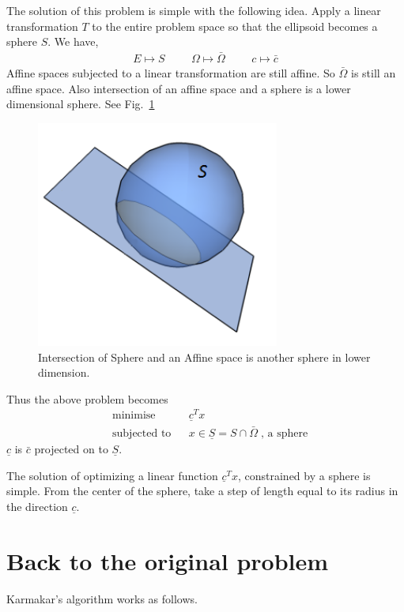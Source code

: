 \documentclass[10pt]{article}
\begin{document}
The solution of this problem is simple with the following idea. Apply a linear transformation $T$ to the entire problem space so that the ellipsoid becomes a sphere $S$. We have,
\begin{align*}
	E\mapsto S\hspace{1cm}
	\Omega \mapsto \bar{\Omega}\hspace{1cm}
	c \mapsto \bar{c}
\end{align*}
Affine spaces subjected to a linear transformation are still affine. So $\bar{\Omega}$ is still an affine space. Also intersection of an affine space and a sphere is a lower dimensional sphere. See Fig.~\ref{fig:sphereintersectionaffine}
\begin{figure}[htbp]
	\begin{center}
	\vspace{1cm}
	\includegraphics[width=8cm]{sphereintersectionaffine.png}
	\end{center}
	\caption{Intersection of Sphere and an Affine space is another sphere in lower dimension.}
	\label{fig:sphereintersectionaffine}
\end{figure}

Thus the above problem becomes 
\begin{align*}
&\text{minimise} &&\underline{c}^Tx\\
&\text{subjected to} &&x\in \underline{S}=S\cap \bar{\Omega}\;\text{, a sphere}
\end{align*}
$\underline{c}$ is $\bar{c}$ projected on to $\underline{S}$.


The solution of optimizing a linear function $\underline{c}^Tx$, constrained by a sphere is simple. From the center of the sphere, take a step of length equal to its radius in the direction $\underline{c}$.
\section{Back to the original problem}
Karmakar's algorithm works as follows.
\end{document}
